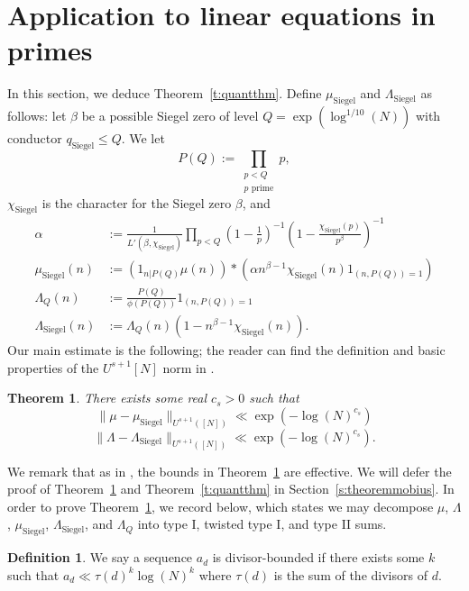 \documentclass[11pt, a4paper]{amsart}
\theoremstyle{plain}
\theoremstyle{plain}
\newtheorem{theorem}{Theorem}
\theoremstyle{definition}
\newtheorem{definition}{Definition}
\theoremstyle{remark}
\numberwithin{equation}{section}
\numberwithin{lemma}{section}
\numberwithin{proposition}{section}
\numberwithin{corollary}{section}
\numberwithin{definition}{section}
\numberwithin{claim}{section}
\begin{document}
\section{Application to linear equations in primes}\label{s:linearprimes}
In this section, we deduce Theorem~\ref{t:quantthm}. Define $\mu_{\mathrm{Siegel}}$ and $\Lambda_{\mathrm{Siegel}}$ as follows: let $\beta$ be a possible Siegel zero of level $Q = \exp(\log^{1/10}(N))$ with conductor $q_{\mathrm{Siegel}} \le Q$. We let
$$P(Q) := \prod_{\substack{p < Q \\ p \text{ prime}}} p,$$
$\chi_{\mathrm{Siegel}}$ is the character for the Siegel zero $\beta$, and
\begin{align*}
\alpha &:= \frac{1}{L'(\beta, \chi_{\mathrm{Siegel}})}\prod_{p < Q} \left(1 - \frac{1}{p}\right)^{-1}\left(1 - \frac{\chi_{\mathrm{Siegel}}(p)}{p^\beta}\right)^{-1} \\
\mu_{\mathrm{Siegel}}(n) &:= (1_{n | P(Q)} \mu(n)) * (\alpha n^{\beta - 1} \chi_{\mathrm{Siegel}}(n)1_{(n, P(Q)) = 1}) \\
\Lambda_Q(n) &:= \frac{P(Q)}{\phi(P(Q))}1_{(n, P(Q)) = 1} \\
\Lambda_{\mathrm{Siegel}}(n) &:= \Lambda_Q(n)(1 - n^{\beta - 1} \chi_{\mathrm{Siegel}}(n)).
\end{align*}
Our main estimate is the following; the reader can find the definition and basic properties of the $U^{s + 1}[N]$ norm in \cite[Chapter 1.3]{Tao12}.
\begin{theorem}\label{t:mobiusuniformity}
There exists some real $c_s > 0$ such that
$$\|\mu - \mu_{\mathrm{Siegel}}\|_{U^{s + 1}([N])} \ll \exp(-\log(N)^{c_s})$$
$$\|\Lambda - \Lambda_{\mathrm{Siegel}}\|_{U^{s + 1}([N])} \ll \exp(-\log(N)^{c_s}).$$
\end{theorem}
We remark that as in \cite{TT21}, the bounds in Theorem~\ref{t:mobiusuniformity} are effective. We will defer the proof of Theorem~\ref{t:mobiusuniformity} and Theorem~\ref{t:quantthm} in Section~\ref{s:theoremmobius}. In order to prove Theorem~\ref{t:mobiusuniformity}, we record \cite[Proposition 7.2]{TT21} below, which states we may decompose $\mu$, $\Lambda$, $\mu_{\mathrm{Siegel}}$, $\Lambda_{\mathrm{Siegel}}$, and $\Lambda_Q$ into type I, twisted type I, and type II sums. 
\begin{definition}
We say a sequence $a_d$ is divisor-bounded if there exists some $k$ such that $a_d \ll \tau(d)^k\log(N)^k$ where $\tau(d)$ is the sum of the divisors of $d$.
\end{definition}
\end{document}

